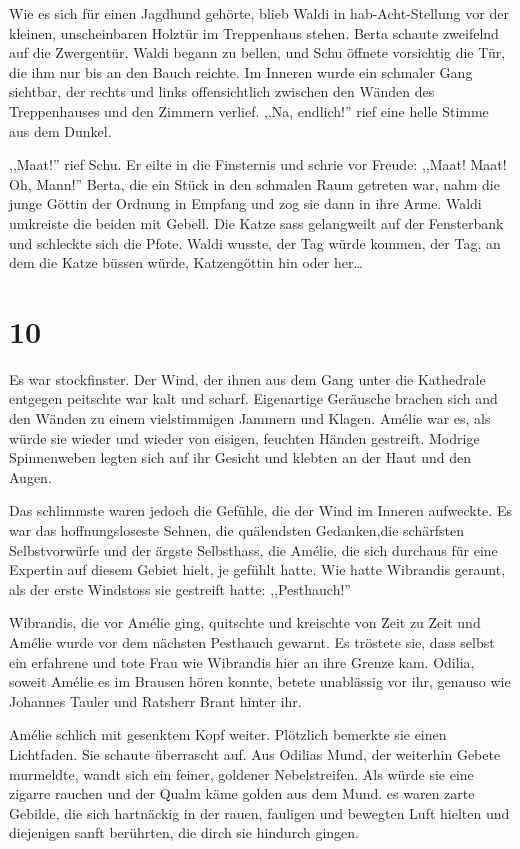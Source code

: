 Wie es sich für einen Jagdhund gehörte, blieb Waldi in hab-Acht-Stellung vor der kleinen, unscheinbaren Holztür im Treppenhaus stehen. Berta schaute zweifelnd auf die Zwergentür. Waldi begann zu bellen, und Schu öffnete vorsichtig die Tür, die ihm nur bis an den Bauch reichte. Im Inneren wurde ein schmaler Gang sichtbar, der rechts und links offensichtlich zwischen den Wänden des Treppenhauses und den Zimmern verlief. ,,Na, endlich!'' rief eine helle Stimme aus dem Dunkel.

,,Maat!'' rief Schu. Er eilte in die Finsternis und schrie vor Freude: ,,Maat! Maat! Oh, Mann!'' Berta, die ein Stück in den schmalen Raum getreten war, nahm die junge Göttin der Ordnung in Empfang und zog sie dann in ihre Arme. Waldi umkreiste die beiden mit Gebell. Die Katze sass gelangweilt auf der Fensterbank und schleckte sich die Pfote. Waldi wusste, der Tag würde kommen, der Tag, an dem die Katze büssen würde, Katzengöttin hin oder her\dots


\section*{10}

Es war stockfinster. Der Wind, der ihnen aus dem Gang unter die Kathedrale entgegen peitschte war kalt und scharf. Eigenartige Geräusche brachen sich and den Wänden zu einem vielstimmigen Jammern und Klagen. Amélie war es, als würde sie wieder und wieder von eisigen, feuchten Händen gestreift. Modrige Spinnenweben legten sich auf ihr Gesicht und klebten an der Haut und den Augen. 

Das schlimmste waren jedoch die Gefühle, die der Wind im Inneren aufweckte. Es war das hoffnungsloseste Sehnen, die quälendsten Gedanken,die schärfsten Selbstvorwürfe und der ärgste Selbsthass, die Amélie, die sich durchaus für eine Expertin auf diesem Gebiet hielt, je gefühlt hatte. Wie hatte Wibrandis geraunt, als der erste Windstoss sie gestreift hatte: ,,Pesthauch!'' 

Wibrandis, die vor Amélie ging, quitschte und kreischte von Zeit zu Zeit und Amélie wurde vor dem nächsten Pesthauch gewarnt. Es tröstete sie, dass selbst ein erfahrene und tote Frau wie Wibrandis hier an ihre Grenze kam. Odilia, soweit Amélie es im Brausen hören konnte, betete unablässig vor ihr, genauso wie Johannes Tauler und Ratsherr Brant hinter ihr.

Amélie schlich mit gesenktem Kopf weiter. Plötzlich bemerkte sie einen Lichtfaden. Sie schaute überrascht auf. Aus Odilias Mund, der weiterhin Gebete murmeldte, wandt sich ein feiner, goldener Nebelstreifen. Als würde sie eine zigarre rauchen und der Qualm käme golden aus dem Mund. es waren zarte Gebilde, die sich hartnäckig in der rauen, fauligen und bewegten Luft hielten und diejenigen sanft berührten, die dirch sie hindurch gingen.

